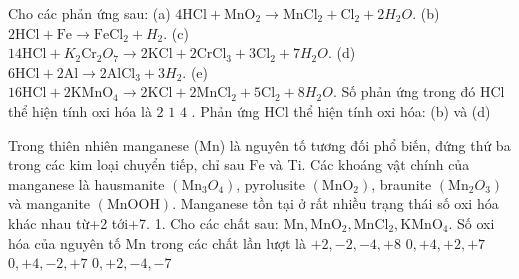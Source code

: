 \begin{ex}[Đề TSĐH A-2008]
	Cho các phản ứng sau:
	(a) $4 \mathrm{HCl}+\mathrm{MnO}_2 \to \mathrm{MnCl}_2+\mathrm{Cl}_2+2 H_2O$.
	(b) $2\mathrm{HCl}+\mathrm{Fe} \to \mathrm{FeCl}_2+H_2$.
	(c) $14 \mathrm{HCl}+K_2\mathrm{Cr}_2O_7 \to 2 \mathrm{KCl}+2 \mathrm{CrCl}_3+3 \mathrm{Cl}_2+7 H_2O$.
	(d) $6\mathrm{HCl}+2\mathrm{Al} \to 2\mathrm{AlCl}_3+3H_2$.
	(e) $16 \mathrm{HCl}+2 \mathrm{KMnO}_4 \to 2 \mathrm{KCl}+2 \mathrm{MnCl}_2+5 \mathrm{Cl}_2+8 H_2O$.
	Số phản ứng trong đó $\mathrm{HCl}$ thể hiện tính oxi hóa là
	\choice
	{$2$}
	{$1$}
	{$4$}
	{.
		Phản ứng $\mathrm{HCl}$ thể hiện tính oxi hóa: (b) và (d)}
	\loigiai{}
\end{ex}

\begin{ex}Trong thiên nhiên manganese (Mn) là nguyên tố tương đối phổ biến, đứng thứ ba trong các kim loại chuyển tiếp, chỉ sau $\mathrm{Fe}$ và Ti. Các khoáng vật chính của manganese là hausmanite $\left(\mathrm{Mn}_3O_4\right)$, pyrolusite $\left(\mathrm{MnO}_2\right)$, braunite $\left(\mathrm{Mn}_2O_3\right)$ và manganite $(\mathrm{MnOOH})$. Manganese tồn tại ở rất nhiều trạng thái số oxi hóa khác nhau từ+2 tới+7.
	1. Cho các chất sau: $\mathrm{Mn}, \mathrm{MnO}_2, \mathrm{MnCl}_2, \mathrm{KMnO}_4$. Số oxi hóa của nguyên tố $\mathrm{Mn}$ trong các chất lần lượt là
	\choice
	{$+2,-2,-4,+8$}
	{\True $0,+4,+2,+7$}
	{$0,+4,-2,+7$}
	{$0,+2,-4,-7$}
	\loigiai{}
\end{ex}

